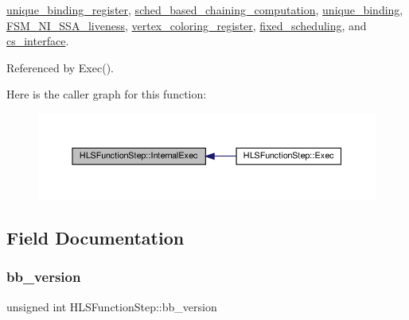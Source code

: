 \hyperlink{classunique__binding__register_a2ac66d0bc11cd4e54db2042014b52291}{unique\+\_\+binding\+\_\+register}, \hyperlink{classsched__based__chaining__computation_a9318a49e9ae291770e05f12c7dae246c}{sched\+\_\+based\+\_\+chaining\+\_\+computation}, \hyperlink{classunique__binding_a7d59ec7a2432423cb1e29fe246f73032}{unique\+\_\+binding}, \hyperlink{classFSM__NI__SSA__liveness_a4779c2c3c70f08d16a164de63ecc25e9}{F\+S\+M\+\_\+\+N\+I\+\_\+\+S\+S\+A\+\_\+liveness}, \hyperlink{classvertex__coloring__register_ab7217f4137e671acf2dc41da060318b7}{vertex\+\_\+coloring\+\_\+register}, \hyperlink{classfixed__scheduling_a7dbf0a071862208536ac8fa0803cf8d7}{fixed\+\_\+scheduling}, and \hyperlink{classcs__interface_aee8a7879cdc7e9591c5c7bce22c3d1a7}{cs\+\_\+interface}.



Referenced by Exec().

Here is the caller graph for this function\+:
\nopagebreak
\begin{figure}[H]
\begin{center}
\leavevmode
\includegraphics[width=350pt]{d9/d41/classHLSFunctionStep_a8db4c00d080655984d98143206fc9fa8_icgraph}
\end{center}
\end{figure}


\subsection{Field Documentation}
\mbox{\label{classHLSFunctionStep_a9cfc12812bd2a56cd16144a7dab31182}} 
\subsubsection{\texorpdfstring{bb\+\_\+version}{bb\_version}}
{\footnotesize\ttfamily unsigned int H\+L\+S\+Function\+Step\+::bb\+\_\+version\hspace{0.3cm}{\ttfamily [protected]}}



